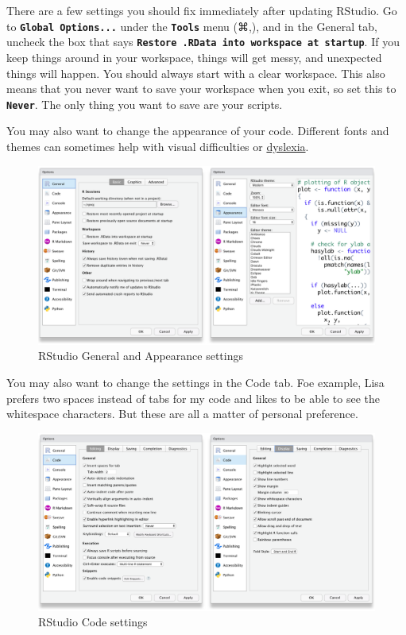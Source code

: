 \documentclass[
  oneside]{book}
\begin{document}
There are a few settings you should fix immediately after updating RStudio. Go to \textbf{\texttt{Global\ Options...}} under the \textbf{\texttt{Tools}} menu (⌘,), and in the General tab, uncheck the box that says \textbf{\texttt{Restore\ .RData\ into\ workspace\ at\ startup}}. If you keep things around in your workspace, things will get messy, and unexpected things will happen. You should always start with a clear workspace. This also means that you never want to save your workspace when you exit, so set this to \textbf{\texttt{Never}}. The only thing you want to save are your scripts.

You may also want to change the appearance of your code. Different fonts and themes can sometimes help with visual difficulties or \href{https://datacarpentry.org/blog/2017/09/coding-and-dyslexia}{dyslexia}.

\begin{figure}

{\centering \includegraphics[width=1\linewidth]{images/rstudio_settings_general_appearance} 

}

\caption{RStudio General and Appearance settings}\label{fig:settings-general}
\end{figure}

You may also want to change the settings in the Code tab. Foe example, Lisa prefers two spaces instead of tabs for my code and likes to be able to see the whitespace{} characters. But these are all a matter of personal preference.

\begin{figure}

{\centering \includegraphics[width=1\linewidth]{images/rstudio_settings_code} 

}

\caption{RStudio Code settings}\label{fig:settings-code}
\end{figure}
\end{document}
